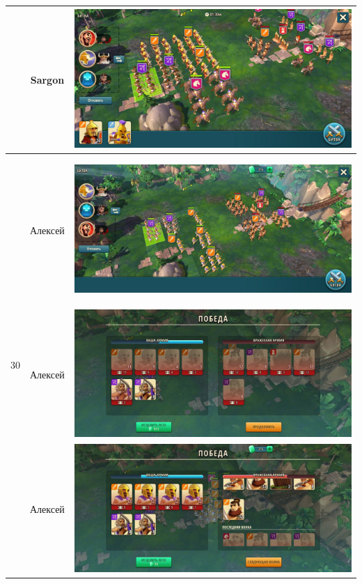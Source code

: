 \begin{longtable}{|c|c|c|}
    & Sargon &
    \includegraphics[width=0.75\linewidth]{./parts/media/TreasureHunt/30/sargon/photo_2022-04-07_10-04-47.jpg} \\
    \hline
    \multirow{10}{*}{30} & Алексей &
    \hypertarget{fight30}{\includegraphics[width=0.75\linewidth]{./parts/media/TreasureHunt/30/alexey/photo_2022-04-07_14-26-42.jpg}} \\
    & Алексей &
    \includegraphics[width=0.75\linewidth]{./parts/media/TreasureHunt/30/alexey/photo_2022-04-07_14-26-46.jpg} \\
    & Алексей &
    \includegraphics[width=0.75\linewidth]{./parts/media/TreasureHunt/30/alexey/photo_2022-04-07_14-26-29.jpg} \\

\end{longtable}
